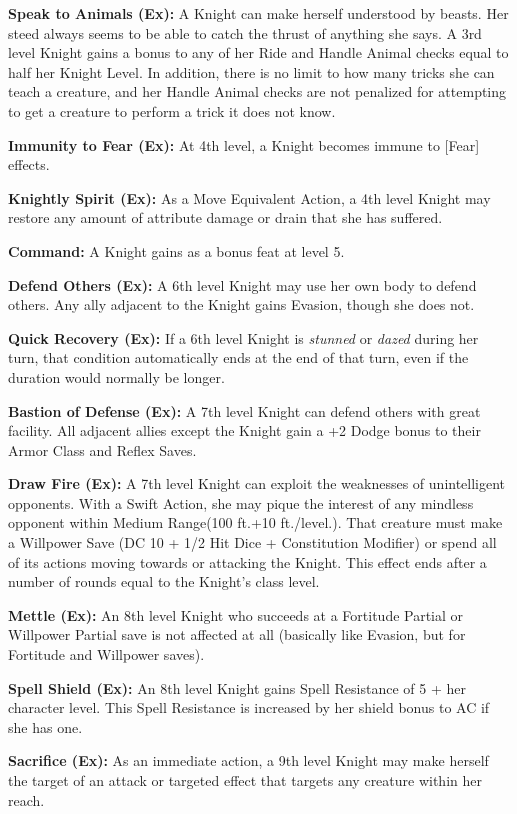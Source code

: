 \textbf{Speak to Animals (Ex):} A Knight can make herself understood by beasts. Her steed always seems to be able to catch the thrust of anything she says. A 3rd level Knight gains a bonus to any of her Ride and Handle Animal checks equal to half her Knight Level. In addition, there is no limit to how many tricks she can teach a creature, and her Handle Animal checks are not penalized for attempting to get a creature to perform a trick it does not know.

\textbf{Immunity to Fear (Ex):} At 4th level, a Knight becomes immune to [Fear] effects.

\textbf{Knightly Spirit (Ex):} As a Move Equivalent Action, a 4th level Knight may restore any amount of attribute damage or drain that she has suffered.

\textbf{Command:} A Knight gains  as a bonus feat at level 5.

\textbf{Defend Others (Ex):} A 6th level Knight may use her own body to defend others. Any ally adjacent to the Knight gains Evasion, though she does not.

\textbf{Quick Recovery (Ex):} If a 6th level Knight is \textit{stunned} or \textit{dazed} during her turn, that condition automatically ends at the end of that turn, even if the duration would normally be longer.

\textbf{Bastion of Defense (Ex):} A 7th level Knight can defend others with great facility. All adjacent allies except the Knight gain a +2 Dodge bonus to their Armor Class and Reflex Saves.

\textbf{Draw Fire (Ex):} A 7th level Knight can exploit the weaknesses of unintelligent opponents. With a Swift Action, she may pique the interest of any mindless opponent within Medium Range(100 ft.+10 ft./level.). That creature must make a Willpower Save (DC 10 + 1/2 Hit Dice + Constitution Modifier) or spend all of its actions moving towards or attacking the Knight. This effect ends after a number of rounds equal to the Knight's class level.

\textbf{Mettle (Ex):} An 8th level Knight who succeeds at a Fortitude Partial or Willpower Partial save is not affected at all (basically like Evasion, but for Fortitude and Willpower saves).

\textbf{Spell Shield (Ex):} An 8th level Knight gains Spell Resistance of 5 + her character level. This Spell Resistance is increased by her shield bonus to AC if she has one.

\textbf{Sacrifice (Ex):} As an immediate action, a 9th level Knight may make herself the target of an attack or targeted effect that targets any creature within her reach.

